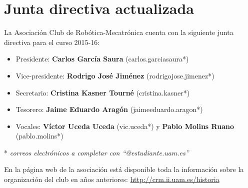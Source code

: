 \documentclass[12pt,twoside]{report}
\begin{document}
\chapter{Junta directiva actualizada}

La Asociación Club de Robótica-Mecatrónica cuenta con la siguiente junta directiva para el curso 2015-16:

\begin{itemize}
\item Presidente: \textbf{Carlos García Saura} (carlos.garciasaura*)
\item Vice-presidente: \textbf{Rodrigo José Jiménez} (rodrigojose.jimenez*)
\item Secretario: \textbf{Cristina Kasner Tourné} (cristina.kasner*)
\item Tesorero: \textbf{Jaime Eduardo Aragón} (jaimeeduardo.aragon*)
\item Vocales: \textbf{Víctor Uceda Uceda} (vic.uceda*) y \textbf{Pablo Molins Ruano} (pablo.molins*)
\end{itemize}

* \textit{correos electrónicos a completar con ``@estudiante.uam.es''}

En la página web de la asociación está disponible toda la información sobre la organización del club en años anteriores:
\url{http://crm.ii.uam.es/historia}
\end{document}
